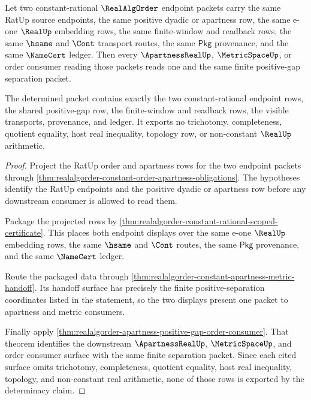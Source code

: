 \begin{theorem}
\label{thm:realalgorder-constant-positive-gap-consumer-determinacy}
Let two constant-rational $\RealAlgOrder$ endpoint packets carry the same
RatUp source endpoints, the same positive dyadic or apartness row, the same
e-one $\RealUp$ embedding rows, the same finite-window and readback rows, the
same $\hsame$ and $\Cont$ transport routes, the same $\mathsf{Pkg}$
provenance, and the same $\NameCert$ ledger. Then every $\ApartnessRealUp$,
$\MetricSpaceUp$, or order consumer reading those packets reads one and the
same finite positive-gap separation packet.

The determined packet contains exactly the two constant-rational endpoint
rows, the shared positive-gap row, the finite-window and readback rows, the
visible transports, provenance, and ledger. It exports no trichotomy,
completeness, quotient equality, host real inequality, topology row, or
non-constant $\RealUp$ arithmetic.
\end{theorem}
\begin{proof}
Project the RatUp order and apartness rows for the two endpoint packets through
\autoref{thm:realalgorder-constant-order-apartness-obligations}. The
hypotheses identify the RatUp endpoints and the positive dyadic or apartness
row before any downstream consumer is allowed to read them.

Package the projected rows by
\autoref{thm:realalgorder-constant-rational-scoped-certificate}. This places
both endpoint displays over the same e-one $\RealUp$ embedding rows, the same
$\hsame$ and $\Cont$ routes, the same $\mathsf{Pkg}$ provenance, and the same
$\NameCert$ ledger.

Route the packaged data through
\autoref{thm:realalgorder-constant-apartness-metric-handoff}. Its handoff
surface has precisely the finite positive-separation coordinates listed in the
statement, so the two displays present one packet to apartness and metric
consumers.

Finally apply
\autoref{thm:realalgorder-apartness-positive-gap-order-consumer}. That theorem
identifies the downstream $\ApartnessRealUp$, $\MetricSpaceUp$, and order
consumer surface with the same finite separation packet. Since each cited
surface omits trichotomy, completeness, quotient equality, host real
inequality, topology, and non-constant real arithmetic, none of those rows is
exported by the determinacy claim.
\end{proof}

